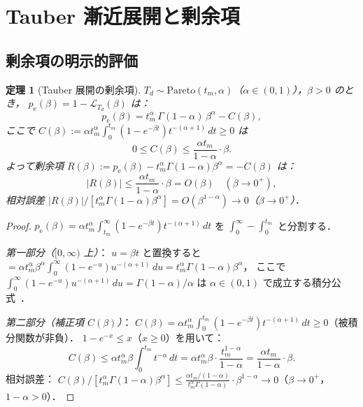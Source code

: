 \documentclass[12pt,a4paper]{article}
\theoremstyle{plain}
\newtheorem{theorem}{定理}[section]
\theoremstyle{definition}
\theoremstyle{remark}
\newcommand{\calL}{\mathcal{L}}
\newcommand{\pe}{p_{\mathrm{e}}}
\begin{document}
\section{Tauber 漸近展開と剰余項}
\label{sec:tauberian}

\subsection{剰余項の明示的評価}

\begin{theorem}[Tauber 展開の剰余項]\label{thm:remainder}
$T_d\sim\mathrm{Pareto}(t_m,\alpha)$（$\alpha\in(0,1)$），$\beta>0$ のとき，
$\pe(\beta)=1-\calL_{T_d}(\beta)$ は：
\begin{equation}\label{eq:pe_expansion}
\pe(\beta)=t_m^\alpha\,\Gamma(1-\alpha)\,\beta^\alpha - C(\beta),
\end{equation}
ここで $C(\beta):=\alpha t_m^\alpha\int_0^{t_m}(1-e^{-\beta t})t^{-(\alpha+1)}\,dt\ge0$ は
\begin{equation}\label{eq:C_bound}
0\le C(\beta)\le\frac{\alpha t_m}{1-\alpha}\cdot\beta.
\end{equation}
よって剰余項 $R(\beta):=\pe(\beta)-t_m^\alpha\Gamma(1-\alpha)\beta^\alpha=-C(\beta)$ は：
\begin{equation}\label{eq:R_bound}
|R(\beta)|\le\frac{\alpha t_m}{1-\alpha}\cdot\beta = O(\beta)
\quad(\beta\to0^+),
\end{equation}
相対誤差 $|R(\beta)|/[t_m^\alpha\Gamma(1-\alpha)\beta^\alpha]=O(\beta^{1-\alpha})\to0$（$\beta\to0^+$）．
\end{theorem}

\begin{proof}
$\pe(\beta)=\alpha t_m^\alpha\int_{t_m}^\infty(1-e^{-\beta t})t^{-(\alpha+1)}\,dt$ を
$\int_0^\infty-\int_0^{t_m}$ と分割する．

\emph{第一部分（$[0,\infty)$ 上）}：
$u=\beta t$ と置換すると
$=\alpha t_m^\alpha\beta^\alpha\int_0^\infty(1-e^{-u})u^{-(\alpha+1)}\,du
=t_m^\alpha\Gamma(1-\alpha)\beta^\alpha$，
ここで $\int_0^\infty(1-e^{-u})u^{-(\alpha+1)}\,du=\Gamma(1-\alpha)/\alpha$
は $\alpha\in(0,1)$ で成立する積分公式~\cite{feller1971}．

\emph{第二部分（補正項 $C(\beta)$）}：
$C(\beta)=\alpha t_m^\alpha\int_0^{t_m}(1-e^{-\beta t})t^{-(\alpha+1)}\,dt\ge0$（被積分関数が非負）．
$1-e^{-x}\le x$（$x\ge0$）を用いて：
\[
C(\beta)\le\alpha t_m^\alpha\beta\int_0^{t_m}t^{-\alpha}\,dt
=\alpha t_m^\alpha\beta\cdot\frac{t_m^{1-\alpha}}{1-\alpha}
=\frac{\alpha t_m}{1-\alpha}\cdot\beta.
\]
相対誤差：
$C(\beta)/[t_m^\alpha\Gamma(1-\alpha)\beta^\alpha]
\le\frac{\alpha t_m/(1-\alpha)}{t_m^\alpha\Gamma(1-\alpha)}\cdot\beta^{1-\alpha}
\to0$（$\beta\to0^+$，$1-\alpha>0$）．
\end{proof}
\end{document}
